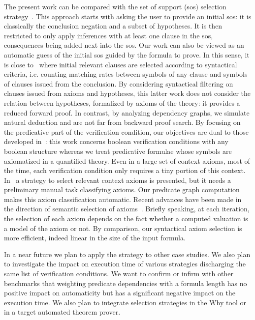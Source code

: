 \documentclass{acm_proc_article-sp}
\theoremstyle{nonumberplain}
\begin{document}
The present work can be compared with the set of support (sos)
selection strategy~\cite{WosRC65,PlaistedY03}. This approach starts
with asking the user to provide an initial sos: it is classically the
 conclusion negation and a subset of hypotheses. It is then restricted
 to only apply inferences with at least one clause in the sos,
consequences being added next into the sos. Our work can also be viewed
as an automatic  guess of the initial sos guided by the formula to
prove. In this sense, it is close to~\cite{MP06} where initial relevant
clauses are selected according to syntactical criteria, i.e. counting
matching rates between symbols of any clause and symbols of clauses
issued from the conclusion. By considering syntactical filtering on
clauses issued from axioms and hypotheses, this latter work does not
consider the relation between hypotheses, formalized by axioms of  the
theory: it  provides a reduced forward proof. In contrast, by analyzing
dependency graphs, we simulate natural deduction and are not far from
backward proof search. By focusing on the predicative part of the
verification condition, our objectives are dual to those developed
in~\cite{Gri00}: this work concerns boolean verification conditions
with any boolean structure whereas we treat predicative formulae whose
symbols are axiomatized in a quantified theory. Even in a large set of
context axioms, most of the time, each verification condition only
requires a tiny portion of this context. In~\cite{RF97theorem,DR06} a
strategy to select relevant context axioms is presented, but it needs a
preliminary manual task classifying axioms. Our predicate graph
computation makes this  axiom classification automatic. Recent advances
have been made in the direction of semantic selection of
axioms~\cite{SutcliffeP07,pudlak07}. Briefly speaking, at each
iteration, the selection of each axiom depends on the fact whether a
computed valuation is a model of the axiom or not. By comparison, our
syntactical axiom selection is more efficient, indeed linear in the
size of the input formula.





In a near future we plan to apply the strategy to other case studies.
We also plan to investigate the impact on execution time of various
strategies discharging the same list of verification conditions. We
want to confirm or infirm with other benchmarks that weighting
predicate dependencies with a formula length has no positive impact on
automaticity but has a significant negative impact on the execution
time. We also plan to integrate selection strategies in the Why tool or
in a target automated theorem prover.
\end{document}
